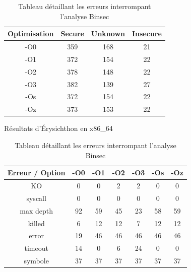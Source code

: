 \newpage
\begin{table}[!th]
\centering
\begin{adjustwidth}{-20mm}{0mm}
\begin{minipage}{0.48\textwidth}
    \centering
    \begin{tabular}{c|ccc}
        \textbf{Optimisation} & \textbf{Secure} & \textbf{Unknown} & \textbf{Insecure} \\
        \hline
        \rowcolor{blue!5}
        -O0 & 359 & 168 & 21 \\
        -O1 & 372 & 154 & 22 \\
        \rowcolor{blue!5}
        -O2 & 378 & 148 & 22 \\
        -O3 & 382 & 139 & 27 \\
        \rowcolor{blue!5}
        -Os & 372 & 154 & 22 \\
        -Oz & 373 & 153 & 22 \\
    \end{tabular}
    \caption{Résultats d'Érysichthon en x86\_64}
    \label{tab:resultats_finaux}
\end{minipage}%
\hfill
\begin{minipage}{0.48\textwidth}
    \centering
    \begin{tabular}{c|cccccc}
        \textbf{Erreur / Option} & \textbf{-O0} & \textbf{-O1} & \textbf{-O2} & \textbf{-O3} & \textbf{-Os} & \textbf{-Oz} \\
        \hline
        \rowcolor{blue!5}
        KO        & 0  & 0  & 2  & 2  & 0  & 0  \\
        syscall   & 0  & 0  & 0  & 0  & 0  & 0  \\
        \rowcolor{blue!5}
        max depth & 92 & 59 & 45 & 23 & 58 & 59 \\
        killed    & 6  & 12 & 12 & 7  & 12 & 12 \\
        \rowcolor{blue!5}
        error     & 19 & 46 & 46 & 46 & 46 & 46 \\
        timeout   & 14 & 0  & 6  & 24 & 0  & 0  \\
        \rowcolor{blue!5}
        symbole    & 37 & 37 & 37 & 37 & 37 & 37 \\
    \end{tabular}
    \caption{Tableau détaillant les erreurs interrompant l'analyse Binsec}
    \label{table:detail_unknown}
\end{minipage}
\end{adjustwidth}
\end{table}


